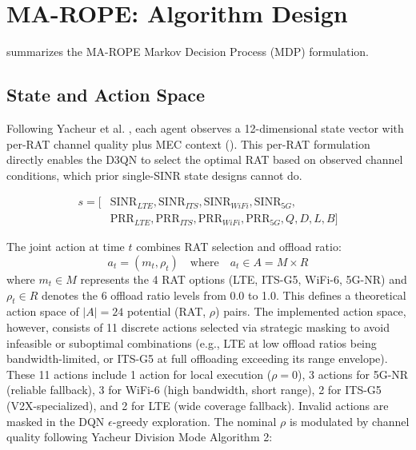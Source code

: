 \documentclass[journal,10pt,twocolumn]{IEEEtran}
\begin{document}
\section{MA-ROPE: Algorithm Design}

 summarizes the MA-ROPE Markov Decision Process (MDP) formulation.

\subsection{State and Action Space}

Following Yacheur et al. \cite{yacheur2023}, each agent observes a 12-dimensional state vector with per-RAT channel quality plus MEC context (). This per-RAT formulation directly enables the D3QN to select the optimal RAT based on observed channel conditions, which prior single-SINR state designs cannot do.

\begin{equation}
\label{eq:state}
\begin{split}s = [&\text{SINR}_{LTE}, \text{SINR}_{ITS}, \text{SINR}_{WiFi}, \text{SINR}_{5G}, \\ &\text{PRR}_{LTE}, \text{PRR}_{ITS}, \text{PRR}_{WiFi}, \text{PRR}_{5G}, Q, D, L, B]\end{split}
\end{equation}

The joint action at time $t$ combines RAT selection and offload ratio:
\begin{equation}
\label{eq:action_space}
a_t = (m_t, \rho_t) \quad \text{where} \quad a_t \in A = M \times R
\end{equation}
where $m_t \in M$ represents the 4 RAT options (LTE, ITS-G5, WiFi-6, 5G-NR) and $\rho_t \in R$ denotes the 6 offload ratio levels from 0.0 to 1.0. This defines a theoretical action space of $|A| = 24$ potential (RAT, $\rho$) pairs. The implemented action space, however, consists of 11 discrete actions selected via strategic masking to avoid infeasible or suboptimal combinations (e.g., LTE at low offload ratios being bandwidth-limited, or ITS-G5 at full offloading exceeding its range envelope). These 11 actions include 1 action for local execution ($\rho=0$), 3 actions for 5G-NR (reliable fallback), 3 for WiFi-6 (high bandwidth, short range), 2 for ITS-G5 (V2X-specialized), and 2 for LTE (wide coverage fallback). Invalid actions are masked in the DQN $\epsilon$-greedy exploration. The nominal $\rho$ is modulated by channel quality following Yacheur Division Mode \cite{yacheur2023} Algorithm 2:
\end{document}
